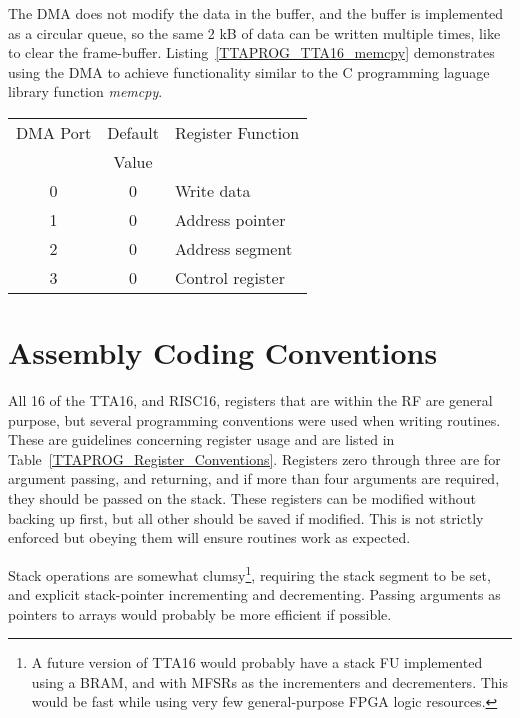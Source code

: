 The DMA does not modify the data in the buffer, and the buffer is implemented
as a circular queue, so the same 2 kB of data can be written multiple times,
like to clear the frame-buffer. Listing~\ref{TTAPROG_TTA16_memcpy} demonstrates
using the DMA to achieve functionality similar to the C programming
laguage library function \textit{memcpy}.

\begin{center}
\begin{tabular}{c c l}
DMA Port	& \multicolumn{1}{c}{Default}	&	Register Function	\\
			& \multicolumn{1}{c}{Value}	&						\\
\hline
0	& 0	&	Write data			\\
1	& 0	&	Address pointer		\\
2	& 0	&	Address segment		\\
3	& 0	&	Control register	\\
\end{tabular}
\end{center}


\section{Assembly Coding Conventions}

All 16 of the TTA16, and RISC16, registers that are within the RF are general
purpose, but several programming conventions were used when writing routines.
These are guidelines concerning register usage and are listed in
Table~\ref{TTAPROG_Register_Conventions}. Registers zero through three are
for argument passing, and returning, and if more than four arguments are
required, they should be passed on the stack. These registers can be modified
without backing up first, but all other should be saved if modified. This is
not strictly enforced but obeying them will ensure routines work as expected.

Stack operations are somewhat clumsy\footnote{A future version of TTA16 would
probably have a stack FU implemented using a BRAM, and with MFSRs as the
incrementers and decrementers. This would be fast while using very few
general-purpose FPGA logic resources.}, requiring the stack segment to be set,
and explicit stack-pointer incrementing and decrementing. Passing arguments as
pointers to arrays would probably be more efficient if possible.

